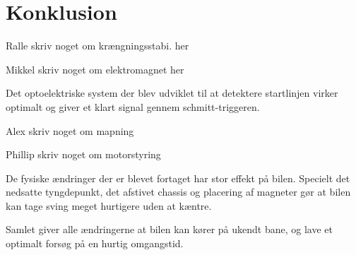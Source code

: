 

\section{Konklusion}
Ralle skriv noget om krængningsstabi. her

Mikkel skriv noget om elektromagnet her

Det optoelektriske system der blev udviklet til at detektere startlinjen virker optimalt og giver et klart signal gennem schmitt-triggeren.

Alex skriv noget om mapning

Phillip skriv noget om motorstyring

De fysiske ændringer der er blevet fortaget har stor effekt på bilen. Specielt det nedsatte tyngdepunkt, det afstivet chassis og placering af magneter gør at bilen kan tage sving meget hurtigere uden at kæntre.

Samlet giver alle ændringerne at bilen kan kører på ukendt bane, og lave et optimalt forsøg på en hurtig omgangstid.
